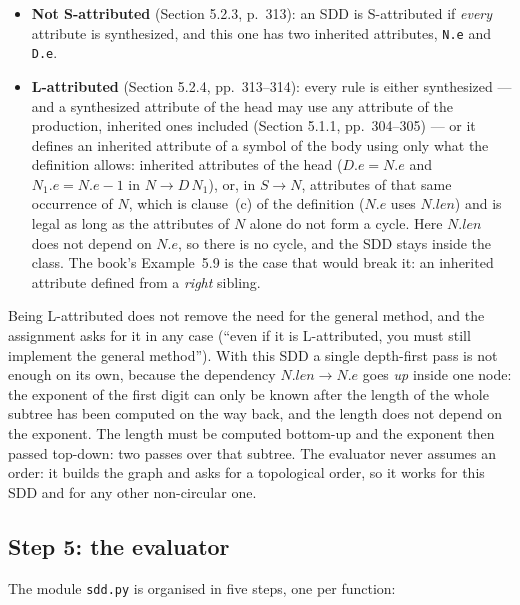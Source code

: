 \documentclass[11pt,letterpaper]{article}
\newcommand{\nt}[1]{\texttt{#1}}
\newcommand{\attr}[1]{\texttt{#1}}
\begin{document}
\begin{itemize}[leftmargin=1.1em,itemsep=2pt]
\item \textbf{Not S-attributed} (Section 5.2.3, p.~313): an SDD is S-attributed if \emph{every}
attribute is synthesized, and this one has two inherited attributes, \attr{N.e} and \attr{D.e}.
\item \textbf{L-attributed} (Section 5.2.4, pp.~313--314): every rule is either synthesized --- and a
synthesized attribute of the head may use any attribute of the production, inherited ones included
(Section 5.1.1, pp.~304--305) --- or it defines an inherited attribute of a symbol of the body using
only what the definition allows: inherited attributes of the head ($D.e = N.e$ and $N_1.e = N.e - 1$
in $N \to D\,N_1$), or, in $S \to N$, attributes of that same occurrence of $N$, which is
clause~(c) of the definition ($N.e$ uses $N.len$) and is legal as long as the attributes of $N$ alone
do not form a cycle. Here $N.len$ does not depend on $N.e$, so there is no cycle, and the SDD stays
inside the class. The book's Example~5.9 is the case that would break it: an inherited attribute
defined from a \emph{right} sibling.
\end{itemize}

Being L-attributed does not remove the need for the general method, and the assignment asks for it in
any case (``even if it is L-attributed, you must still implement the general method''). With this
SDD a single depth-first pass is not enough on its own, because the dependency
$N.len \to N.e$ goes \emph{up} inside one node: the exponent of the first digit can only be known
after the length of the whole subtree has been computed on the way back, and the length does not
depend on the exponent. The length must be computed bottom-up and the exponent then passed top-down:
two passes over that subtree. The evaluator never assumes an order: it builds the graph and asks for
a topological order, so it works for this SDD and for any other non-circular one.

\subsection{Step 5: the evaluator}

The module \nt{sdd.py} is organised in five steps, one per function:
\end{document}

